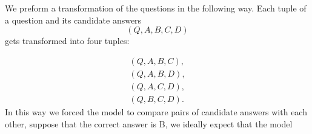 We preform a transformation of the questions in the following way. Each tuple of a question and 
its candidate answers
$$
    (Q,A,B,C,D)
$$
gets transformed into four tuples:

\begin{align*}
       (Q,A,B,C), \\ 
       (Q,A,B,D), \\
       (Q,A,C,D), \\
       (Q,B,C,D).
\end{align*}
In this way we forced the model to compare pairs of candidate answers with each other, suppose that
the correct answer is B, we ideally expect that the model 
